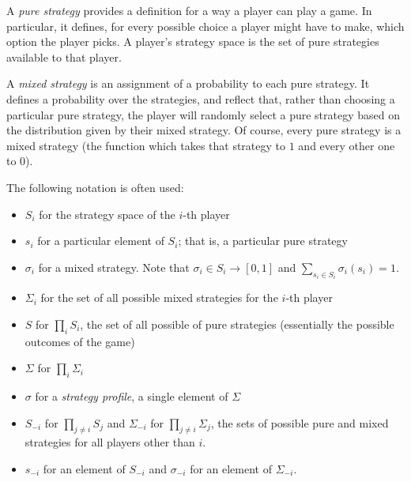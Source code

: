 \documentclass[12pt]{article}
\begin{document}
A \emph{pure strategy} provides a  definition for a way a player can play a game.  In particular, it defines, for every possible choice a player might have to make, which option the player picks.  A player's strategy space is the set of pure strategies available to that player.

A \emph{mixed strategy} is an assignment of a probability to each pure strategy.  It defines a probability over the strategies, and reflect that, rather than choosing a particular pure strategy, the player will randomly select a pure strategy based on the distribution given by their mixed strategy. Of course, every pure strategy is a mixed strategy (the function which takes that strategy to $1$ and every other one to $0$).

The following notation is often used:
\begin{itemize}

\item $S_i$ for the strategy space of the $i$-th player

\item $s_i$ for a particular element of $S_i$; that is, a particular pure strategy

\item $\sigma_i$ for a mixed strategy.  Note that $\sigma_i\in S_i\rightarrow [0,1]$ and $\sum_{s_i\in S_i} \sigma_i(s_i)=1$.

\item $\Sigma_i$ for the set of all possible mixed strategies for the $i$-th player

\item $S$ for $\prod_i S_i$, the set of all possible  of pure strategies (essentially the possible outcomes of the game)

\item $\Sigma$ for $\prod_i \Sigma_i$

\item $\sigma$ for a \emph{strategy profile}, a single element of $\Sigma$

\item $S_{-i}$ for $\prod_{j\neq i} S_j$ and $\Sigma_{-i}$ for $\prod_{j\neq i} \Sigma_j$, the sets of possible pure and mixed strategies for all players other than $i$.

\item $s_{-i}$ for an element of $S_{-i}$ and $\sigma_{-i}$ for an element of $\Sigma_{-i}$.

\end{itemize}
\end{document}
